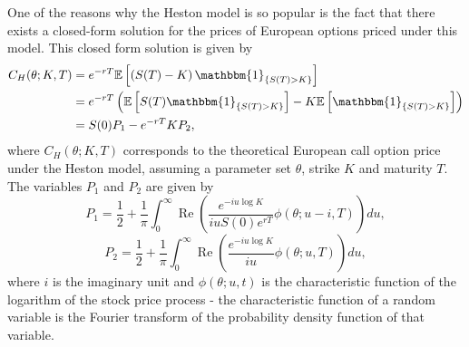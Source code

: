 One of the reasons why the Heston model is so popular is the fact that there exists a closed-form solution for the prices of European options priced under this model. This closed form solution is given by
\begin{equation}\label{CH}
\begin{split}
C_{H}(\theta;K,T)&=e^{-rT}\mathbb{E}\left[\left(S(T)-K\right)\mathbbm{1}_{\left\{S(T)>K\right\}}\right]\\
&=e^{-rT}\left(\mathbb{E}\left[S(T)\mathbbm{1}_{\left\{S(T)>K\right\}}\right]-K\mathbb{E}\left[\mathbbm{1}_{\left\{S(T)>K\right\}}\right]\right)\\
&=S(0)P_1-e^{-rT}KP_2,
\end{split}
\end{equation}
\noindent where $C_{H}(\theta;K,T)$ corresponds to the theoretical European call option price under the Heston model, assuming a parameter set $\theta$, strike $K$ and maturity $T$. The variables $P_1$ and $P_2$ are given by
\begin{equation}\label{P1}
P_1=\frac{1}{2}+\frac{1}{\pi}\int_0^\infty\operatorname{Re}\left(\frac{e^{-iu\log K}}{iuS(0)e^{rT}}\phi(\theta;u-i,T)\right)du,
\end{equation}
\begin{equation}\label{P2}
P_2=\frac{1}{2}+\frac{1}{\pi}\int_0^\infty\operatorname{Re}\left(\frac{e^{-iu\log K}}{iu}\phi(\theta;u,T)\right)du,
\end{equation}
\noindent where $i$ is the imaginary unit and $\phi(\theta;u,t)$ is the characteristic function of the logarithm of the stock price process - the characteristic function of a random variable is the Fourier transform of the probability density function of that variable.


